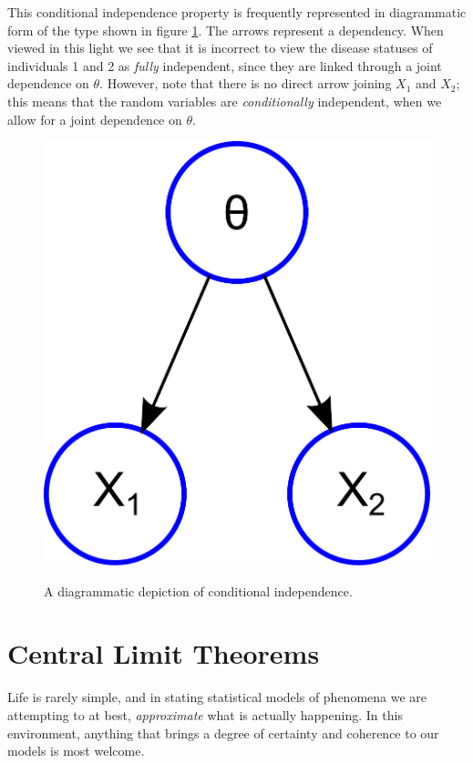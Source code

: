 \documentclass[11pt,fullpage]{book}
\begin{document}
This conditional independence property is frequently represented in diagrammatic form of the type shown in figure \ref{fig:Probability_conditionalIndependence}. The arrows represent a dependency. When viewed in this light we see that it is incorrect to view the disease statuses of individuals 1 and 2 as \textit{fully} independent, since they are linked through a joint dependence on $\theta$. However, note that there is no direct arrow joining $X_1$ and $X_2$; this means that the random variables are \textit{conditionally} independent, when we allow for a joint dependence on $\theta$. 

\begin{figure}
\centering
\scalebox{0.4} 
{\includegraphics{Probability_conditionalIndependence.pdf}}
\caption{A diagrammatic depiction of conditional independence.}\label{fig:Probability_conditionalIndependence}
\end{figure}

\section{Central Limit Theorems}\label{sec:Probability_CLT}
Life is rarely simple, and in stating statistical models of phenomena we are attempting to at best, \textit{approximate} what is actually happening. In this environment, anything that brings a degree of certainty and coherence to our models is most welcome. 
\end{document}
